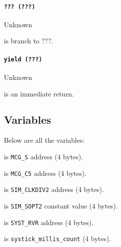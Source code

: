 \paragraph{\texttt{??? (???)}} Unknown

 is branch to ???.

\paragraph{\texttt{yield (???)}} Unknown

 is an immediate return.

\subsection{Variables}

Below are all the variables:

 is \texttt{MCG\_S} address (4 bytes).

 is \texttt{MCG\_C5} address (4 bytes).

 is \texttt{SIM\_CLKDIV2} address (4 bytes).

 is \texttt{SIM\_SOPT2} constant value (4 bytes).

 is \texttt{SYST\_RVR} address (4 bytes).

 is \texttt{systick\_millis\_count} (4 bytes).
